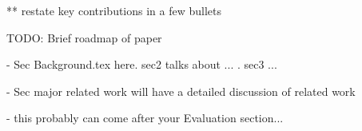 ** restate key contributions in a few bullets



TODO: Brief roadmap of paper

- Sec Background.tex here. sec2 talks about ... . sec3 ...

- Sec major related work will have a detailed discussion of related work

- this probably can come after your Evaluation section...
 

%

